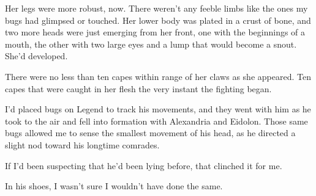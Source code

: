 Her legs were more robust, now.  There weren't any feeble limbs like the ones my bugs had glimpsed or touched.  Her lower body was plated in a crust of bone, and two more heads were just emerging from her front, one with the beginnings of a mouth, the other with two large eyes and a lump that would become a snout.  She'd developed.



There were no less than ten capes within range of her claws as she appeared.  Ten capes that were caught in her flesh the very instant the fighting began.



I'd placed bugs on Legend to track his movements, and they went with him as he took to the air and fell into formation with Alexandria and Eidolon.  Those same bugs allowed me to sense the smallest movement of his head, as he directed a slight nod toward his longtime comrades.



If I'd been suspecting that he'd been lying before, that clinched it for me.



In his shoes, I wasn't sure I wouldn't have done the same.





